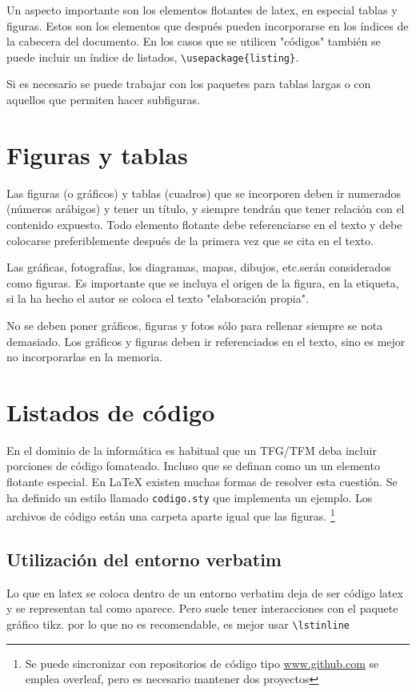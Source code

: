 Un aspecto importante son los elementos flotantes de latex, en especial tablas y figuras. Estos son los elementos que después pueden incorporarse en los índices de la cabecera del documento. En los casos que se utilicen "códigos" también se puede incluir un índice de listados, \lstinline[language=enparrafo]!\usepackage{listing}!.

Si es necesario se puede trabajar con los paquetes para tablas largas o con aquellos que permiten hacer subfiguras.

 \section{Figuras y tablas}

Las  figuras  (o  gráficos)  y  tablas  (cuadros)  que  se  incorporen  deben  ir  numerados  (números  arábigos)  y  tener  un  título,  y  siempre  tendrán  que  tener  relación  con el contenido expuesto.  Todo elemento flotante debe referenciarse en el texto y debe colocarse  preferiblemente después de la primera vez que se cita en el texto.

Las  gráficas, fotografías,  los  diagramas,  mapas,  dibujos,  etc.serán  considerados como  figuras. Es importante que se incluya el origen de la figura, en la etiqueta, si la ha hecho el autor se coloca el texto "elaboración propia".

No se deben poner gráficos, figuras y fotos sólo para rellenar siempre se nota demasiado. Los gráficos y figuras deben ir referenciados en el texto, sino es mejor no incorporarlas en la memoria.



 \section{Listados de código}

En el dominio de la informática es habitual que un TFG/TFM deba incluir porciones de código fomateado. Incluso que se definan como un un elemento flotante especial. En \LaTeX{} existen muchas formas de resolver esta cuestión. Se ha definido un estilo llamado \lstinline[language=enparrafo]!codigo.sty! que implementa un ejemplo. Los archivos de código están una carpeta aparte igual que las figuras. \footnote{Se puede sincronizar con repositorios de código tipo \url{www.github.com} se emplea overleaf, pero es necesario mantener dos proyectos}

\subsection{Utilización del entorno verbatim}
Lo que en latex se coloca dentro de un entorno verbatim deja de ser código latex y se representan tal como aparece. Pero suele tener interacciones con el paquete  gráfico tikz. por lo que no es recomendable, es mejor usar \lstinline[language=enparrafo]!\lstinline!

